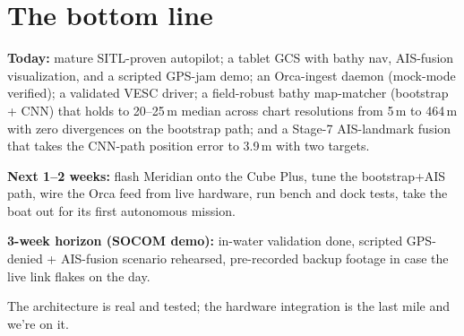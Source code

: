 \documentclass[10pt,a4paper]{article}
\begin{document}
\section{The bottom line}
\begin{tcolorbox}[colframe=mSafe, colback=white, title=\normalsize What you're signing up for]
\textbf{Today:} mature SITL-proven autopilot; a tablet GCS with
bathy nav, AIS-fusion visualization, and a scripted GPS-jam demo;
an Orca-ingest daemon (mock-mode verified); a validated VESC driver;
a field-robust bathy map-matcher (bootstrap + CNN) that holds to 20--25\,m
median across chart resolutions from 5\,m to 464\,m with zero divergences
on the bootstrap path; and a Stage-7 AIS-landmark fusion that takes the
CNN-path position error to 3.9\,m with two targets.

\textbf{Next 1--2 weeks:} flash Meridian onto the Cube Plus, tune the
bootstrap+AIS path, wire the Orca feed from live hardware, run bench
and dock tests, take the boat out for its first autonomous mission.

\textbf{3-week horizon (SOCOM demo):} in-water validation done, scripted
GPS-denied + AIS-fusion scenario rehearsed, pre-recorded backup footage
in case the live link flakes on the day.

The architecture is real and tested; the hardware integration is the
last mile and we're on it.
\end{tcolorbox}
\end{document}
